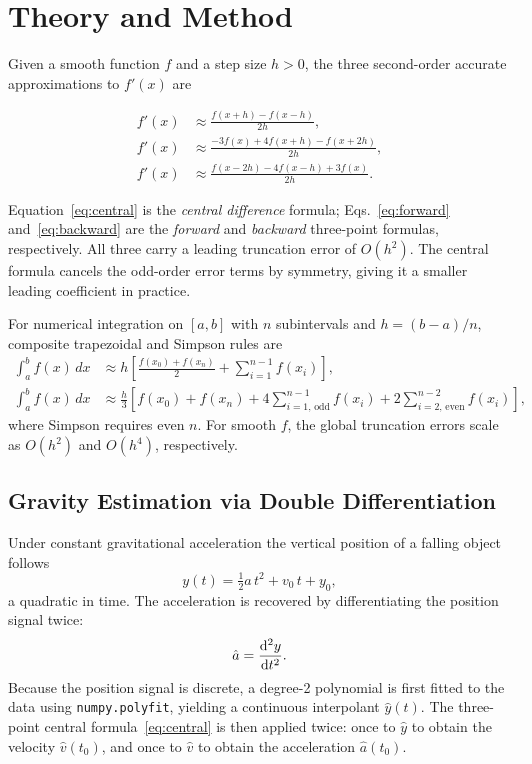 \documentclass[letterpaper,twocolumn,fleqn]{article}
\begin{document}
\section{Theory and Method}
Given a smooth function $f$ and a step size $h>0$, the three second-order accurate approximations to $f'(x)$ are

\begin{align}
f'(x) &\approx \frac{f(x+h)-f(x-h)}{2h}, \label{eq:central}\\
f'(x) &\approx \frac{-3f(x)+4f(x+h)-f(x+2h)}{2h}, \label{eq:forward}\\
f'(x) &\approx \frac{f(x-2h)-4f(x-h)+3f(x)}{2h}. \label{eq:backward}
\end{align}

Equation~\eqref{eq:central} is the \emph{central difference} formula; Eqs.~\eqref{eq:forward} and~\eqref{eq:backward} are the \emph{forward} and \emph{backward} three-point formulas, respectively. All three carry a leading truncation error of $O(h^{2})$. The central formula cancels the odd-order error terms by symmetry, giving it a smaller leading coefficient in practice.

For numerical integration on $[a,b]$ with $n$ subintervals and $h=(b-a)/n$, composite trapezoidal and Simpson rules are
\begin{align}
\int_a^b f(x)\,dx &\approx h\left[\frac{f(x_0)+f(x_n)}{2}+\sum_{i=1}^{n-1}f(x_i)\right], \\
\int_a^b f(x)\,dx &\approx \frac{h}{3}\left[f(x_0)+f(x_n)+4\sum_{i=1,\,\text{odd}}^{n-1} f(x_i)+2\sum_{i=2,\,\text{even}}^{n-2} f(x_i)\right],
\end{align}
where Simpson requires even $n$. For smooth $f$, the global truncation errors scale as $O(h^2)$ and $O(h^4)$, respectively.

\subsection{Gravity Estimation via Double Differentiation}
Under constant gravitational acceleration the vertical position of a falling object follows
\[
y(t) = \tfrac{1}{2}a\,t^{2} + v_{0}\,t + y_{0},
\]
a quadratic in time. The acceleration is recovered by differentiating the position signal twice:
\[
\hat{a} = \dv[2]{y}{t}.
\]
Because the position signal is discrete, a degree-2 polynomial is first fitted to the data using \texttt{numpy.polyfit}, yielding a continuous interpolant $\hat{y}(t)$. The three-point central formula~\eqref{eq:central} is then applied twice: once to $\hat{y}$ to obtain the velocity $\hat{v}(t_{0})$, and once to $\hat{v}$ to obtain the acceleration $\hat{a}(t_{0})$.
\end{document}
